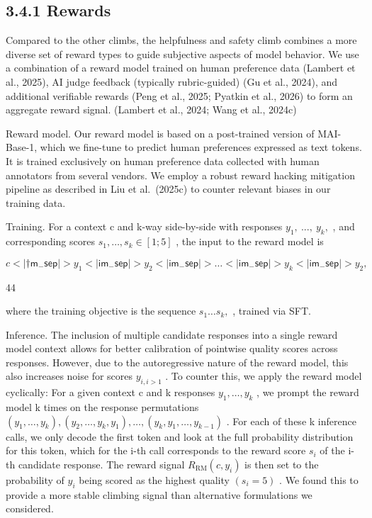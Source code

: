 \documentclass[
  10
]{article}
\begin{document}
\subsection{3.4.1 Rewards}\label{rewards}

Compared to the other climbs, the helpfulness and safety climb combines
a more diverse set of reward types to guide subjective aspects of model
behavior. We use a combination of a reward model trained on human
preference data (Lambert et al., 2025), AI judge feedback (typically
rubric-guided) (Gu et al., 2024), and additional verifiable rewards
(Peng et al., 2025; Pyatkin et al., 2026) to form an aggregate reward
signal. (Lambert et al., 2024; Wang et al., 2024c)

Reward model. Our reward model is based on a post-trained version of
MAI-Base-1, which we fine-tune to predict human preferences expressed as
text tokens. It is trained exclusively on human preference data
collected with human annotators from several vendors. We employ a robust
reward hacking mitigation pipeline as described in Liu et al.~(2025c) to
counter relevant biases in our training data.

Training. For a context c and k-way side-by-side with responses
\(y _ { 1 } , ~ . . . , ~ y _ { k } ,\) , and corresponding scores
\(s _ { 1 } , \ldots , s _ { k } \in [ 1 ; 5 ]\) , the input to the
reward model is

\[
c < | \dagger \mathsf { m _ { - } ^ { } s e p } | > y _ { 1 } < | \mathsf { i m _ { - } s e p } | > y _ { 2 } < | \mathsf { i m _ { - } s e p } | > \ldots < | \mathsf { i m _ { - } s e p } | > y _ { k } < | \mathsf { i m _ { - } s e p } | > y _ { 2 } ,
\]

44

where the training objective is the sequence
\(s _ { 1 } \ldots s _ { k } ,\) , trained via SFT.

Inference. The inclusion of multiple candidate responses into a single
reward model context allows for better calibration of pointwise quality
scores across responses. However, due to the autoregressive nature of
the reward model, this also increases noise for scores
\(y _ { i , i > 1 }\) . To counter this, we apply the reward model
cyclically: For a given context c and k responses
\(y _ { 1 } , \ldots , y _ { k }\) , we prompt the reward model k times
on the response permutations
\(( y _ { 1 } , \dots , y _ { k } ) , ( y _ { 2 } , \dots , y _ { k } , y _ { 1 } ) , \dots , ( y _ { k } , y _ { 1 } , \dots , y _ { k - 1 } )\)
. For each of these k inference calls, we only decode the first token
and look at the full probability distribution for this token, which for
the i-th call corresponds to the reward score \(s _ { i }\) of the i-th
candidate response. The reward signal
\(R _ { \mathrm { R M } } ( c , y _ { i } )\) is then set to the
probability of \(y _ { i }\) being scored as the highest quality
\(( s _ { i } = 5 )\) . We found this to provide a more stable climbing
signal than alternative formulations we considered.
\end{document}
